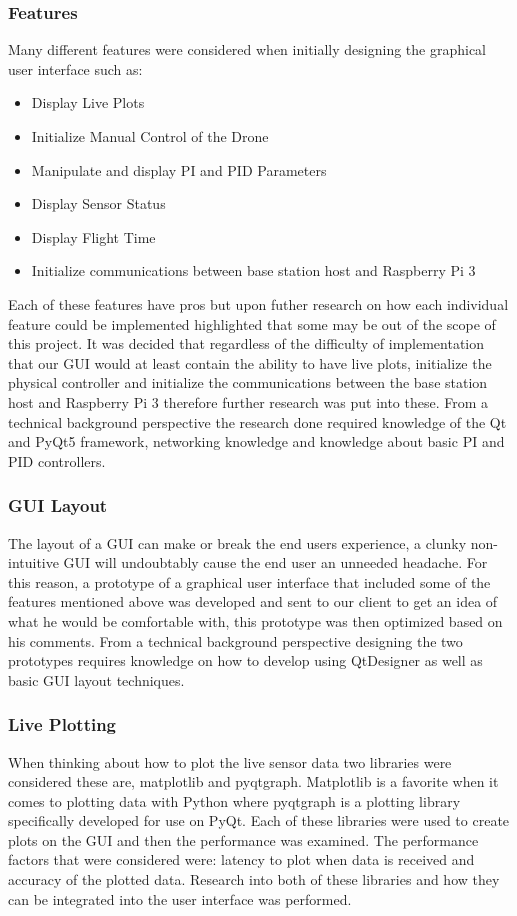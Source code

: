 \subsubsection{Features}
Many different features were considered when initially designing the graphical user interface such as: 
\begin{itemize}
	\item Display Live Plots 
	\item Initialize Manual Control of the Drone
	\item Manipulate and display PI and PID Parameters
	\item Display Sensor Status
	\item Display Flight Time
	\item Initialize communications between base station host and Raspberry Pi 3
\end{itemize}
Each of these features have pros but upon futher research on how each individual feature could be implemented highlighted that some may be out of the scope of this project. It was decided that regardless of the difficulty of implementation that our GUI would at least contain the ability to have live plots, initialize the physical controller and initialize the communications between the base station host and Raspberry Pi 3 therefore further research was put into these. From a technical background perspective the research done required knowledge of the Qt and PyQt5 framework, networking knowledge and knowledge about basic PI and PID controllers.  

\subsubsection{GUI Layout}  
The layout of a GUI can make or break the end users experience, a clunky non-intuitive GUI will undoubtably cause the end user an unneeded headache. For this reason, a prototype of a graphical user interface that included some of the features mentioned above was developed and sent to our client to get an idea of what he would be comfortable with, this prototype was then optimized based on his comments. From a technical background perspective designing the two prototypes requires knowledge on how to develop using QtDesigner as well as basic GUI layout techniques. 

\subsubsection{Live Plotting}
When thinking about how to plot the live sensor data two libraries were considered these are, matplotlib and pyqtgraph. Matplotlib is a favorite when it comes to plotting data with Python where pyqtgraph is a plotting library specifically developed for use on PyQt. Each of these libraries were used to create plots on the GUI and then the performance was examined. The performance factors that were considered were: latency to plot when data is received and accuracy of the plotted data. Research into both of these libraries and how they can be integrated into the user interface was performed.

